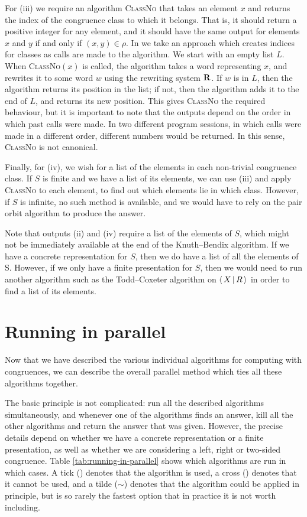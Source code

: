 For (iii) we require an algorithm \textsc{ClassNo} that takes an element $x$ and
returns the index of the congruence class to which it belongs.  That is, it
should return a positive integer for any element, and it should have the same
output for elements $x$ and $y$ if and only if $(x,y) \in \rho$.  In
\libsemigroups{} we take an approach which creates indices for classes as calls
are made to the algorithm.  We start with an empty list $L$.  When
\textsc{ClassNo}$(x)$ is called, the algorithm takes a word representing $x$,
and rewrites it to some word $w$ using the rewriting system $\mathbf{R}$.  If $w$ is
in $L$, then the algorithm returns its position in the list; if not, then the
algorithm adds it to the end of $L$, and returns its new position.  This gives
\textsc{ClassNo} the required behaviour, but it is important to note that the
outputs depend on the order in which past calls were made.  In two different
program sessions, in which calls were made in a different order, different
numbers would be returned.  In this sense, \textsc{ClassNo} is not canonical.

Finally, for (iv), we wish for a list of the elements in each non-trivial
congruence class.  If $S$ is finite and we have a list of its elements, we can
use (iii) and apply \textsc{ClassNo} to each element, to find out which elements
lie in which class.  However, if $S$ is infinite, no such method is available,
and we would have to rely on the pair orbit algorithm to produce the answer.

Note that outputs (ii) and (iv) require a list of the elements of $S$, which
might not be immediately available at the end of the Knuth--Bendix algorithm.
If we have a concrete representation for $S$, then we do have a list of all the
elements of S.  However, if we only have a finite presentation for $S$, then we
would need to run another algorithm such as the Todd--Coxeter algorithm on
$\left\langle \, X \, \middle| \, R \, \right\rangle$ in order to find a list of its elements.

\section{Running in parallel}
\label{sec:running-in-parallel}

Now that we have described the various individual algorithms for computing with
congruences, we can describe the overall parallel method which ties all these
algorithms together.

The basic principle is not complicated: run all the described algorithms
simultaneously, and whenever one of the algorithms finds an answer, kill all the
other algorithms and return the answer that was given.  However, the precise
details depend on whether we have a concrete representation or a finite
presentation, as well as whether we are considering a left, right or two-sided
congruence.  Table \ref{tab:running-in-parallel} shows which algorithms are run
in which cases.  A tick (\cmark) denotes that the algorithm is used, a cross
(\xmark) denotes that it cannot be used, and a tilde ($\sim$) denotes that the
algorithm could be applied in principle, but is so rarely the fastest option that in practice
it is not worth including.


